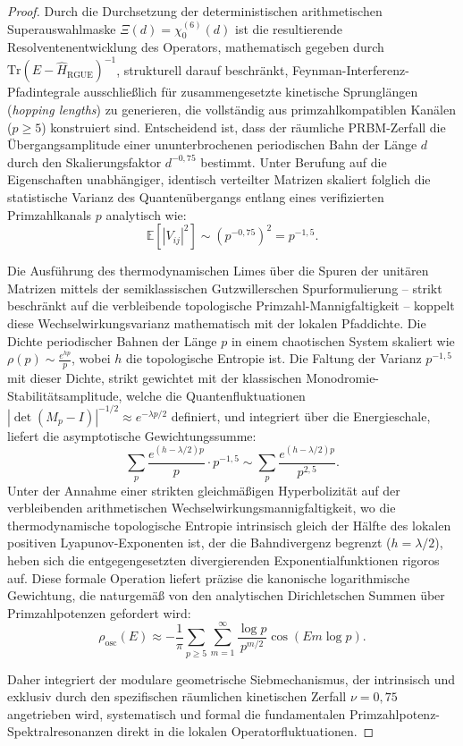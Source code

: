 \documentclass[aps,prl,preprint,superscriptaddress,floatfix]{revtex4-2}
\begin{document}
\begin{proof}
Durch die Durchsetzung der deterministischen arithmetischen Superauswahlmaske $\Xi(d) = \chi_0^{(6)}(d)$ ist die resultierende Resolventenentwicklung des Operators, mathematisch gegeben durch $\text{Tr}(E - \hat{H}_{\text{RGUE}})^{-1}$, strukturell darauf beschränkt, Feynman-Interferenz-Pfadintegrale ausschließlich für zusammengesetzte kinetische Sprunglängen (\textit{hopping lengths}) zu generieren, die vollständig aus primzahlkompatiblen Kanälen ($p \ge 5$) konstruiert sind.
Entscheidend ist, dass der räumliche PRBM-Zerfall die Übergangsamplitude einer ununterbrochenen periodischen Bahn der Länge $d$ durch den Skalierungsfaktor $d^{-0,75}$ bestimmt.
Unter Berufung auf die Eigenschaften unabhängiger, identisch verteilter Matrizen skaliert folglich die statistische Varianz des Quantenübergangs entlang eines verifizierten Primzahlkanals $p$ analytisch wie:
\begin{equation}
\mathbb{E}[|V_{ij}|^2] \sim (p^{-0,75})^2 = p^{-1,5}.
\end{equation}

Die Ausführung des thermodynamischen Limes über die Spuren der unitären Matrizen mittels der semiklassischen Gutzwillerschen Spurformulierung – strikt beschränkt auf die verbleibende topologische Primzahl-Mannigfaltigkeit – koppelt diese Wechselwirkungsvarianz mathematisch mit der lokalen Pfaddichte.
Die Dichte periodischer Bahnen der Länge $p$ in einem chaotischen System skaliert wie $\rho(p) \sim \frac{e^{h p}}{p}$, wobei $h$ die topologische Entropie ist.
Die Faltung der Varianz $p^{-1,5}$ mit dieser Dichte, strikt gewichtet mit der klassischen Monodromie-Stabilitätsamplitude, welche die Quantenfluktuationen $|\det(M_p - I)|^{-1/2} \approx e^{-\lambda p / 2}$ definiert, und integriert über die Energieschale, liefert die asymptotische Gewichtungssumme:
\begin{equation}
\sum_{p} \frac{e^{(h - \lambda/2) p}}{p} \cdot p^{-1,5} \sim \sum_{p} \frac{e^{(h - \lambda/2) p}}{p^{2,5}}.
\end{equation}
Unter der Annahme einer strikten gleichmäßigen Hyperbolizität auf der verbleibenden arithmetischen Wechselwirkungsmannigfaltigkeit, wo die thermodynamische topologische Entropie intrinsisch gleich der Hälfte des lokalen positiven Lyapunov-Exponenten ist, der die Bahndivergenz begrenzt ($h = \lambda / 2$), heben sich die entgegengesetzten divergierenden Exponentialfunktionen rigoros auf. Diese formale Operation liefert präzise die kanonische logarithmische Gewichtung, die naturgemäß von den analytischen Dirichletschen Summen über Primzahlpotenzen gefordert wird:
\begin{equation}
\rho_{\text{osc}}(E) \approx -\frac{1}{\pi} \sum_{p \ge 5} \sum_{m=1}^{\infty} \frac{\log p}{p^{m/2}} \cos(E m \log p).
\end{equation}

Daher integriert der modulare geometrische Siebmechanismus, der intrinsisch und exklusiv durch den spezifischen räumlichen kinetischen Zerfall $\nu=0,75$ angetrieben wird, systematisch und formal die fundamentalen Primzahlpotenz-Spektralresonanzen direkt in die lokalen Operatorfluktuationen.
\end{proof}
\end{document}
